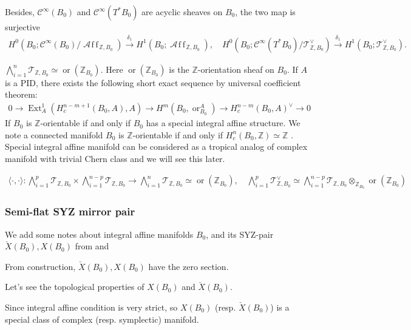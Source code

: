 \documentclass[a4paper,dvipdfmx,reqno,12pt]{amsart}
\theoremstyle{definition}
\newcommand{\Z}{\mathbb{Z}}%
\newcommand{\mcal}[1]{\mathcal{#1}}%
\newcommand{\opn}[1]{\operatorname{#1}}
\newcommand{\abk}[1]{\langle {#1} \rangle}%
\newcommand{\xto}[1]{\xrightarrow{#1}}
\newcommand{\TBZ}{\mcal{T}_{\Z,B_0}}
\newcommand{\AffS}{{\mathop{\mcal{A}\!f\!\!f\!}\nolimits}}
\numberwithin{equation}{section}
\begin{document}
Besides, $\mcal{C}^{\infty}(B_0)$ and $\mcal{C}^{\infty}(T^{*}B_0)$ are acyclic sheaves on $B_0$, the two map is surjective
\begin{align}
  H^{0}(B_0; \mcal{C}^{\infty}(B_0)/\AffS_{\Z,B_0})\xto{\delta_1} H^{1}(B_0;\AffS_{\Z,B_0}),\quad  H^{0}(B_0;\mcal{C}^{\infty}(T^{*}B_0)/\mcal{T}_{\Z,B_0}^{\vee})\xto{\delta_1}H^{1}(B_0;\TBZ^{\vee}).
\end{align}

$\bigwedge^{n}_{i=1}\TBZ\simeq \opn{or}(\Z_{B_0})$. Here $\opn{or}(\Z_{B_0})$ is the $\Z$-orientation sheaf on $B_0$.
If $A$ is a PID, there exists the following short exact sequence  by universal coefficient theorem:
\begin{align}
  0\to \opn{Ext}^{1}_{A}(H^{n-m+1}_c(B_0,A),A) \to H^{m}(B_0,\opn{or}^{A}_{B_0})\to H^{n-m}_c(B_0,A)^{\vee}\to 0
\end{align}
If
$B_0$ is $\Z$-orientable if and only if $B_0$ has a special integral affine structure. We note a connected manifold $B_0$ is $\Z$-orientable if and only if $H^{n}_c(B_0,\Z)\simeq \Z$
\cite[VI Theorem 6.4]{iversenCohomologySheaves1986a}.
Special integral affine manifold can be considered as a tropical analog of complex manifold with trivial Chern class and we will see this later.

\begin{align}
  \abk{\cdot,\cdot}: \bigwedge_{i=1}^{p} \TBZ\times  \bigwedge_{i=1}^{n-p} \TBZ \to \bigwedge_{i=1}^{n} \TBZ \simeq \opn{or}(\Z_{B_0}),\quad \bigwedge_{i=1}^{p}\TBZ^{\vee}\simeq \bigwedge_{i=1}^{n-p}\TBZ\otimes_{\Z_{B_0}}\opn{or}(\Z_{B_0})
\end{align}

\subsubsection{Semi-flat SYZ mirror pair}

We add some notes about integral affine manifolds $B_0$, and its SYZ-pair $\check{X}(B_0), X(B_0)$ from \cite[Chapter 6]{aspinwallDirichletBranesMirror2009} and \cite{MR2737696,MR3079343}



From construction, $\check{X}(B_0), X(B_0)$ have the zero section.

Let's see the topological properties of $X(B_0)$ and $\check{X}(B_0)$.

Since integral affine condition is very strict, so $X(B_0)$ (resp. $\check{X}(B_0)$) is a special class of complex (resp. symplectic) manifold.
\end{document}
